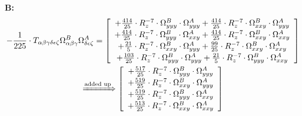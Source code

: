 \documentclass{article}
\begin{document}
\textbf{B:}
\begin{subequations}\begin{gather}
- \frac{1}{225} \cdot T_{\alpha{}\beta{}\gamma{}\delta{}\epsilon{}\zeta{}} \Omega{}^{B}_{\alpha{}\beta{}\gamma{}} \Omega{}^{A}_{\delta{}\epsilon{}\zeta{}} =  \left[ \begin{array}{c} 
 		+ \frac{414}{25} \cdot R_{z}^{-7} \cdot \Omega{}^{B}_{yyy} \cdot \Omega{}^{A}_{yyy}+ \frac{414}{25} \cdot R_{z}^{-7} \cdot \Omega{}^{B}_{xxy} \cdot \Omega{}^{A}_{yyy} 
 \\[0.2em] 		 + \frac{414}{25} \cdot R_{z}^{-7} \cdot \Omega{}^{B}_{yyy} \cdot \Omega{}^{A}_{xxy}+ \frac{414}{25} \cdot R_{z}^{-7} \cdot \Omega{}^{B}_{xxy} \cdot \Omega{}^{A}_{xxy} 
 \\[0.2em] 		 + \frac{21}{5} \cdot R_{z}^{-7} \cdot \Omega{}^{B}_{xxy} \cdot \Omega{}^{A}_{yyy}+ \frac{99}{25} \cdot R_{z}^{-7} \cdot \Omega{}^{B}_{xxy} \cdot \Omega{}^{A}_{xxy} 
 \\[0.2em] 		 + \frac{103}{25} \cdot R_{z}^{-7} \cdot \Omega{}^{B}_{yyy} \cdot \Omega{}^{A}_{yyy}+ \frac{21}{5} \cdot R_{z}^{-7} \cdot \Omega{}^{B}_{yyy} \cdot \Omega{}^{A}_{xxy}
 \end{array}\right] 
\\ \xRightarrow{\text{added up}}
  \left[ \begin{array}{c} 
 		+ \frac{517}{25} \cdot R_{z}^{-7} \cdot \Omega{}^{B}_{yyy} \cdot \Omega{}^{A}_{yyy} 
 \\[0.2em] 		 + \frac{519}{25} \cdot R_{z}^{-7} \cdot \Omega{}^{B}_{xxy} \cdot \Omega{}^{A}_{yyy} 
 \\[0.2em] 		 + \frac{519}{25} \cdot R_{z}^{-7} \cdot \Omega{}^{B}_{yyy} \cdot \Omega{}^{A}_{xxy} 
 \\[0.2em] 		 + \frac{513}{25} \cdot R_{z}^{-7} \cdot \Omega{}^{B}_{xxy} \cdot \Omega{}^{A}_{xxy}
 \end{array}\right] 
\end{gather}\end{subequations}
\end{document}
